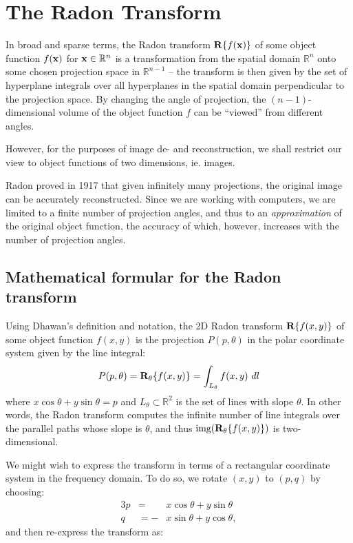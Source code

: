 \section{The Radon Transform}

In broad and sparse terms, the Radon transform $\mathbf{R}\{f(\mathbf{x})\}$ of some
object function $f(\mathbf{x})$ for $\mathbf{x} \in \mathbb R^n$ is a transformation
from the spatial domain $\mathbb R^n$ onto some chosen projection space in
$\mathbb R^{n - 1}$ -- the transform is then given by the set of hyperplane
integrals over all hyperplanes in the spatial domain perpendicular to the
projection space. By changing the angle of projection, the $(n-1)$-dimensional
volume of the object function $f$ can be ``viewed'' from different
angles.

However, for the purposes of image de- and reconstruction, we shall restrict our
view to object functions of two dimensions, ie. images. 

Radon proved in 1917\cite{radon} that given infinitely many projections, the
original image can be accurately reconstructed. Since we are working with
computers, we are limited to a finite number of projection angles, and thus to
an \textit{approximation} of the original object function, the accuracy of
which, however, increases with the number of projection angles.

\subsection{Mathematical formular for the Radon transform}

Using Dhawan's\cite{dhawan} definition and notation, the 2D Radon transform
$\mathbf{R}\{f(x, y)\}$ of some object function $f(x, y)$ is the projection $P(p,
\theta)$ in the polar coordinate system given by the line integral:
\begin{alignat*}{2}
  P(p, \theta) = \mathbf{R}_\theta\{f(x, y)\} = \int_{L_\theta} f(x, y) \ dl
\end{alignat*}
where $x \cos \theta + y \sin \theta = p$ and $L_\theta \subset \mathbb R^2$ is
the set of lines with slope $\theta$. In other words, the Radon transform
computes the infinite number of line integrals over the parallel
paths whose slope is $\theta$, and thus $\text{img}(\mathbf{R}_\theta\{f(x,
y)\})$ is two-dimensional.

\medskip

We might wish to express the transform in terms of a rectangular coordinate
system in the frequency domain. To do so, we rotate $(x, y)$ to $(p, q)$ by
choosing:
\begin{alignat*}{3}
  p &=  &x \cos \theta + y \sin \theta~\\
  q &= -&x \sin \theta + y \cos \theta,
\end{alignat*}
and then re-express the transform as:

